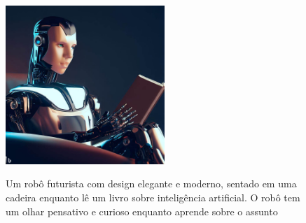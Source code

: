 \begin{figure}[ht]
	\caption{Um robô futurista com design elegante e moderno, sentado em uma cadeira enquanto lê um livro sobre inteligência artificial. O robô tem um olhar pensativo e curioso enquanto aprende sobre o assunto}
	\centering %
	\includegraphics[width=6cm]{figures/ia_concept.jpg} %
	\label{fig:ia_concept}
\end{figure}



